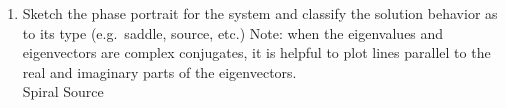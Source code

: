 \documentclass{article}
\begin{document}
\begin{enumerate}
\begin{enumerate}
\item
Sketch the phase portrait for the system and classify the solution behavior as to its type (e.g.~saddle, source, etc.)  Note: when the eigenvalues and eigenvectors are complex conjugates, it is helpful to plot lines parallel to the real and imaginary parts of the eigenvectors.
\\Spiral Source
\begin{figure}[h]
\centerline{}
\end{figure}
\end{enumerate}





\end{enumerate}
\end{document}
